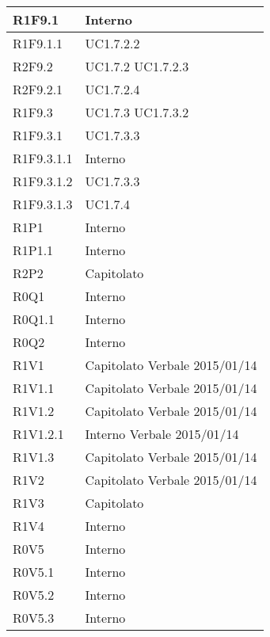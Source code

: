 \begin{center}
\begin{longtable}{| p{4cm} | p{4cm} |}
		\hline
		R1F9.1  &  Interno \\
		\hline
		R1F9.1.1  &  UC1.7.2.2 \\
		\hline
		R2F9.2  &  UC1.7.2 \newline UC1.7.2.3  \\
		\hline
		R2F9.2.1  &  UC1.7.2.4 \\
		\hline
		R1F9.3  & UC1.7.3  \newline UC1.7.3.2 \\
		\hline
		R1F9.3.1  &  UC1.7.3.3\\
		\hline
		R1F9.3.1.1  &  Interno \\
		\hline
		R1F9.3.1.2  &  UC1.7.3.3\\
		\hline
		R1F9.3.1.3  &  UC1.7.4\\
		\hline



		R1P1  &  Interno \\
		\hline
		R1P1.1  &  Interno \\
		\hline
		R2P2  &  Capitolato \\
		\hline



		R0Q1  &  Interno \\
		\hline
		R0Q1.1  &  Interno \\
		\hline
		R0Q2  &  Interno \\
		\hline




		R1V1 &  Capitolato \newline Verbale 2015/01/14 \\
		\hline
		R1V1.1  &  Capitolato \newline Verbale 2015/01/14 \\
		\hline
		R1V1.2  &  Capitolato \newline Verbale 2015/01/14 \\
		\hline
		R1V1.2.1  &  Interno \newline Verbale 2015/01/14 \\
		\hline
		R1V1.3  &  Capitolato \newline Verbale 2015/01/14 \\
		\hline
		R1V2  &  Capitolato \newline Verbale 2015/01/14 \\
		\hline
		R1V3  &  Capitolato \\
		\hline
		R1V4  &  Interno \\
		\hline
		R0V5  &  Interno \\
		\hline
		R0V5.1  &  Interno \\
		\hline
		R0V5.2  &  Interno \\
		\hline
		R0V5.3  &  Interno \\
		\hline


	\end{longtable}
	\egroup
	\end{center}

